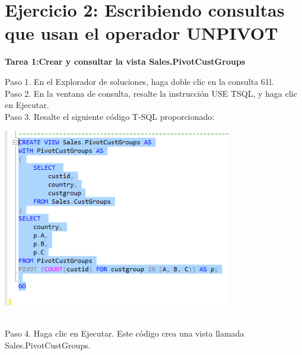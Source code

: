 \section{Ejercicio 2: Escribiendo consultas que usan el operador UNPIVOT} 
\textbf {Tarea 1:Crear y consultar la vista Sales.PivotCustGroups}
\begin{flushleft}
Paso 1. En el Explorador de soluciones, haga doble clic en la consulta 61l.
\textbf{}\\
Paso 2. En la ventana de consulta, resalte la instrucción USE TSQL, y haga clic en Ejecutar.
\textbf{}\\
Paso 3. Resalte el siguiente código T-SQL proporcionado:
\textbf{}\\
\begin{center}
	\includegraphics[width=10cm]{./Imagenes/5img1} 
	\end{center}
\textbf{}\\
Paso 4. Haga clic en Ejecutar. Este código crea una vista llamada Sales.PivotCustGroups.


\end{flushleft}
